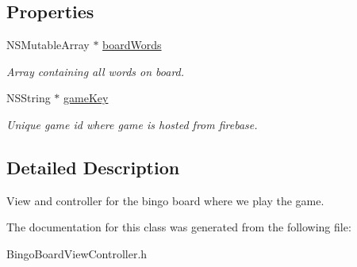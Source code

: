 \subsection*{Properties}
\begin{DoxyCompactItemize}
\item 
\hypertarget{interface_bingo_board_view_controller_a273a683300c3e62e7d67eb59a6e7980b}{N\+S\+Mutable\+Array $\ast$ \hyperlink{interface_bingo_board_view_controller_a273a683300c3e62e7d67eb59a6e7980b}{board\+Words}}\label{interface_bingo_board_view_controller_a273a683300c3e62e7d67eb59a6e7980b}

\begin{DoxyCompactList}\small\item\em Array containing all words on board. \end{DoxyCompactList}\item 
\hypertarget{interface_bingo_board_view_controller_af8b4daa9486d0eb72086a86f65829cdb}{N\+S\+String $\ast$ \hyperlink{interface_bingo_board_view_controller_af8b4daa9486d0eb72086a86f65829cdb}{game\+Key}}\label{interface_bingo_board_view_controller_af8b4daa9486d0eb72086a86f65829cdb}

\begin{DoxyCompactList}\small\item\em Unique game id where game is hosted from firebase. \end{DoxyCompactList}\end{DoxyCompactItemize}


\subsection{Detailed Description}
View and controller for the bingo board where we play the game. 

The documentation for this class was generated from the following file\+:\begin{DoxyCompactItemize}
\item 
Bingo\+Board\+View\+Controller.\+h\end{DoxyCompactItemize}
